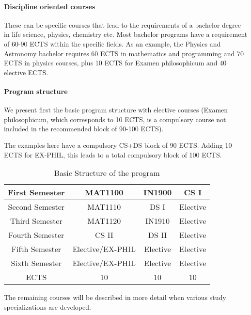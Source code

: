 \documentclass[oneside,final,10pt]{article}
\begin{document}
\paragraph{Discipline oriented courses}

These can be specific courses that lead to the requirements of a bachelor degree in life science, physics, chemistry etc. Most bachelor programs have a requirement of 60-90 ECTS within the specific fields. As an example, the Physics and Astronomy bachelor requires 60 ECTS in mathematics and programming and 70 ECTS in physics courses, plus 10 ECTS for Examen philosophicum and 40 elective ECTS.  



\paragraph{Program structure}
We present first the basic program structure with elective courses (Examen philosophicum, which corresponds to 10 ECTS, is a compulsory course not included in the recommended block of 90-100 ECTS).

The examples here have a compulsory CS+DS block of 90 ECTS. Adding 10 ECTS for EX-PHIL, this leads to a total compulsory block of 100 ECTS. 

\begin{table}[hbtp]
 \caption{Basic Structure of the program}
    \centering
    \begin{tabular}{|c|c|c|c|} \hline
    First Semester & MAT1100 &  IN1900   & CS I  \\ \hline 
    Second Semester & MAT1110 &  DS I   & Elective \\ \hline
    Third Semester & MAT1120 &  IN1910   &  Elective\\ \hline
    Fourth Semester & CS II & DS II    & Elective \\ \hline       
    Fifth Semester & Elective/EX-PHIL & Elective     & Elective \\ \hline
    Sixth Semester & Elective/EX-PHIL & Elective    & Elective \\ \hline
   ECTS & 10 &  10   &  10  \\ \hline    
    \end{tabular}
  
The remaining courses will be described in more detail when various study specializations are developed.   
\end{table}
\end{document}
